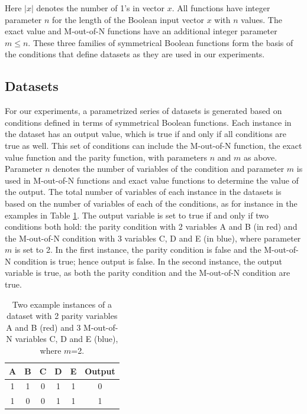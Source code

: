 \documentclass[letterpaper]{article} %
\begin{document}
\noindent Here $|x|$ denotes the number of 1's in vector $x$. All functions have integer parameter $n$ for the length of the Boolean input vector $x$ with $n$ values. The exact value and M-out-of-N functions have an additional integer parameter $m \leq n$. These three families of symmetrical Boolean functions form the basis of the conditions that define datasets as they are used in our experiments. 

\subsection{Datasets}
For our experiments, a parametrized series of datasets is generated based on conditions defined in terms of symmetrical Boolean functions. Each instance in the dataset has an output value, which is true if and only if all conditions are true as well. This set of conditions can include the M-out-of-N function, the exact value function and the parity function, with parameters $n$ and $m$ as above. Parameter $n$ denotes the number of variables of the condition and parameter $m$ is used in M-out-of-N functions and exact value functions to determine the value of the output. 
The total number of variables of each instance in the datasets is based on the number of variables of each of the conditions, as for instance in the examples in Table \ref{tbl:instance_example}. The output variable is set to true if and only if two conditions both hold: the parity condition with 2 variables A and B (in red) and the M-out-of-N condition with 3 variables C, D and E (in blue), where parameter $m$ is set to 2. In the first instance, the parity condition is false and the M-out-of-N condition is true; hence output is false. In the second instance, the output variable is true, as both the parity condition and the M-out-of-N condition are true.

\begin{table}[b]
\caption{Two example instances of a dataset with 2 parity variables A and B (red) and 3 M-out-of-N variables C, D and E (blue), where $m$=2.}
\centering
\begin{tabular}{|c|c|c|c|c|c|}
\hline
\cellcolor[HTML]{FD6864}A & \cellcolor[HTML]{FD6864}B & \cellcolor[HTML]{34CDF9}C & \cellcolor[HTML]{34CDF9}D & \cellcolor[HTML]{34CDF9}E & Output \\ \hline
1                         & 1                         & 0                         & 1                         & 1                         & 0      \\ \hline
1                         & 0                         & 0                         & 1                         & 1                         & 1      \\ \hline
\end{tabular}
\label{tbl:instance_example}
\end{table}
\end{document}
